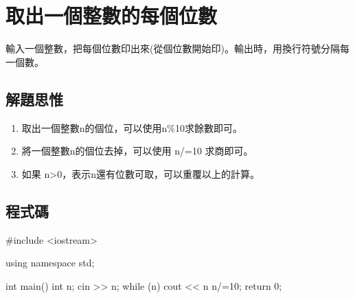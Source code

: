 \section{取出一個整數的每個位數}
輸入一個整數，把每個位數印出來(從個位數開始印)。輸出時，用換行符號分隔每一個數。

\subsection{解題思惟}
\begin{enumerate}
	\item 取出一個整數n的個位，可以使用n\%10求餘數即可。
	\item 將一個整數n的個位去掉，可以使用 n/=10 求商即可。
	\item 如果 n>0，表示n還有位數可取，可以重覆以上的計算。
\end{enumerate}

\subsection{程式碼}
\begin{cppcode}
#include <iostream>

using namespace std;

int main()
{
	int n;
	cin >> n;
	while (n) {
		cout << n%
		n/=10;
	}
	return 0;
}
\end{cppcode}
